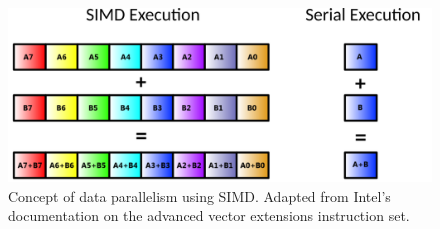 \documentclass[12pt, a4paper]{article}
\begin{document}
\begin{figure}
  \centering
  \includegraphics[scale=0.6]{simd_ex.png}
  \caption{Concept of data parallelism using SIMD. Adapted from Intel's documentation on the advanced vector extensions instruction set. \cite{Intel_AVX}}
  \label{simd_ex}
\end{figure}
\end{document}
